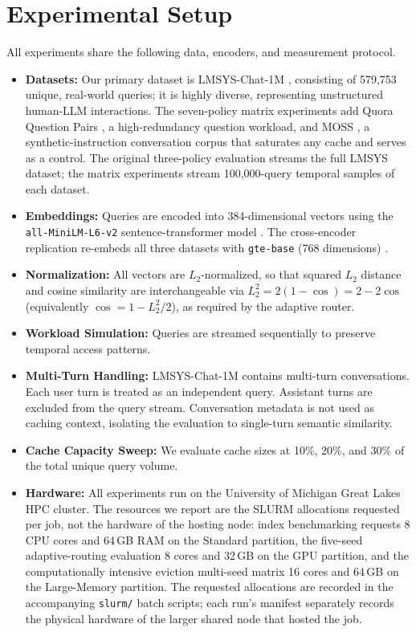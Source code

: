 \documentclass[sigconf,nonacm]{acmart}
\begin{document}
\section{Experimental Setup}
All experiments share the following data, encoders, and measurement protocol.
\begin{itemize}
\item \textbf{Datasets:} Our primary dataset is LMSYS-Chat-1M \cite{zheng2023lmsys}, consisting of 579,753 unique, real-world queries; it is highly diverse, representing unstructured human-LLM interactions. The seven-policy matrix experiments add Quora Question Pairs \cite{iyer2017qqp}, a high-redundancy question workload, and MOSS \cite{sun2024moss}, a synthetic-instruction conversation corpus that saturates any cache and serves as a control. The original three-policy evaluation streams the full LMSYS dataset; the matrix experiments stream 100,000-query temporal samples of each dataset.
\item \textbf{Embeddings:} Queries are encoded into 384-dimensional vectors using the \texttt{all-MiniLM-L6-v2} sentence-transformer model \cite{reimers2019sbert}. The cross-encoder replication re-embeds all three datasets with \texttt{gte-base} (768 dimensions) \cite{li2023gte}.
\item \textbf{Normalization:} All vectors are $L_2$-normalized, so that squared $L_2$ distance and cosine similarity are interchangeable via $L_2^2 = 2(1-\cos) = 2 - 2\cos$ (equivalently $\cos = 1 - L_2^2/2$), as required by the adaptive router.
\item \textbf{Workload Simulation:} Queries are streamed sequentially to preserve temporal access patterns.
\item \textbf{Multi-Turn Handling:} LMSYS-Chat-1M contains multi-turn conversations. Each user turn is treated as an independent query. Assistant turns are excluded from the query stream. Conversation metadata is not used as caching context, isolating the evaluation to single-turn semantic similarity.
\item \textbf{Cache Capacity Sweep:} We evaluate cache sizes at 10\%, 20\%, and 30\% of the total unique query volume.
\item \textbf{Hardware:} All experiments run on the University of Michigan Great Lakes HPC cluster. The resources we report are the SLURM allocations requested per job, not the hardware of the hosting node: index benchmarking requests 8 CPU cores and 64\,GB RAM on the Standard partition, the five-seed adaptive-routing evaluation 8 cores and 32\,GB on the GPU partition, and the computationally intensive eviction multi-seed matrix 16 cores and 64\,GB on the Large-Memory partition. The requested allocations are recorded in the accompanying \texttt{slurm/} batch scripts; each run's manifest separately records the physical hardware of the larger shared node that hosted the job.

\end{itemize}
\end{document}
